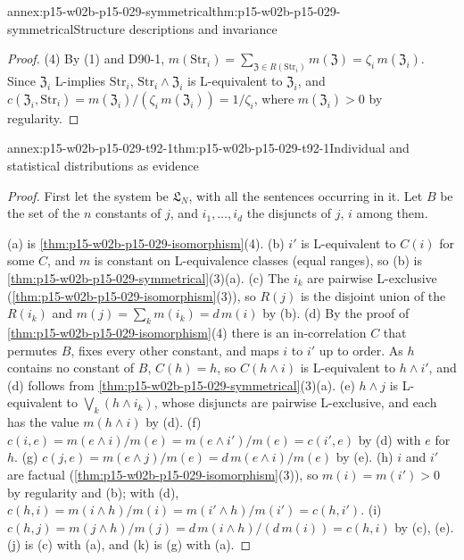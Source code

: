 \begin{annexitem}{annex:p15-w02b-p15-029-symmetrical}{thm:p15-w02b-p15-029-symmetrical}{Structure descriptions and invariance}
\begin{proof}
(4) By (1) and D90-1,
\(m(\mathrm{Str}_i)=\sum_{\mathfrak Z\in R(\mathrm{Str}_i)}m(\mathfrak Z)=\zeta_i\,m(\mathfrak Z_i)\).
Since \(\mathfrak Z_i\) L-implies \(\mathrm{Str}_i\),
\(\mathrm{Str}_i\land\mathfrak Z_i\) is L-equivalent to
\(\mathfrak Z_i\), and
\(c(\mathfrak Z_i,\mathrm{Str}_i)=m(\mathfrak Z_i)/(\zeta_i\,m(\mathfrak Z_i))=1/\zeta_i\),
where \(m(\mathfrak Z_i)>0\) by regularity.
\end{proof}
\end{annexitem}

\begin{annexitem}{annex:p15-w02b-p15-029-t92-1}{thm:p15-w02b-p15-029-t92-1}{Individual and statistical distributions as evidence}
\begin{proof}
First let the system be \(\mathfrak L_N\), with all the sentences
occurring in it. Let \(B\) be the set of the \(n\) constants of \(j\),
and \(i_1,\ldots,i_d\) the disjuncts of \(j\), \(i\) among them.

(a) is \cref{thm:p15-w02b-p15-029-isomorphism}(4). (b) \(i'\) is
L-equivalent to \(C(i)\) for some \(C\), and \(m\) is constant on
L-equivalence classes (equal ranges), so (b) is
\cref{thm:p15-w02b-p15-029-symmetrical}(3)(a). (c) The \(i_k\) are
pairwise L-exclusive (\cref{thm:p15-w02b-p15-029-isomorphism}(3)), so
\(R(j)\) is the disjoint union of the \(R(i_k)\) and
\(m(j)=\sum_km(i_k)=d\,m(i)\) by (b). (d) By the proof of
\cref{thm:p15-w02b-p15-029-isomorphism}(4) there is an in-correlation
\(C\) that permutes \(B\), fixes every other constant, and maps \(i\)
to \(i'\) up to order. As \(h\) contains no constant of \(B\),
\(C(h)=h\), so \(C(h\land i)\) is L-equivalent to \(h\land i'\), and
(d) follows from \cref{thm:p15-w02b-p15-029-symmetrical}(3)(a). (e)
\(h\land j\) is L-equivalent to \(\bigvee_k(h\land i_k)\), whose
disjuncts are pairwise L-exclusive, and each has the value
\(m(h\land i)\) by (d). (f) \(c(i,e)=m(e\land i)/m(e)=m(e\land i')/m(e)=c(i',e)\)
by (d) with \(e\) for \(h\). (g) \(c(j,e)=m(e\land j)/m(e)=d\,m(e\land i)/m(e)\)
by (e). (h) \(i\) and \(i'\) are factual
(\cref{thm:p15-w02b-p15-029-isomorphism}(3)), so \(m(i)=m(i')>0\) by
regularity and (b); with (d),
\(c(h,i)=m(i\land h)/m(i)=m(i'\land h)/m(i')=c(h,i')\). (i)
\(c(h,j)=m(j\land h)/m(j)=d\,m(i\land h)/(d\,m(i))=c(h,i)\) by (c),
(e). (j) is (c) with (a), and (k) is (g) with (a).


\end{proof}
\end{annexitem}
